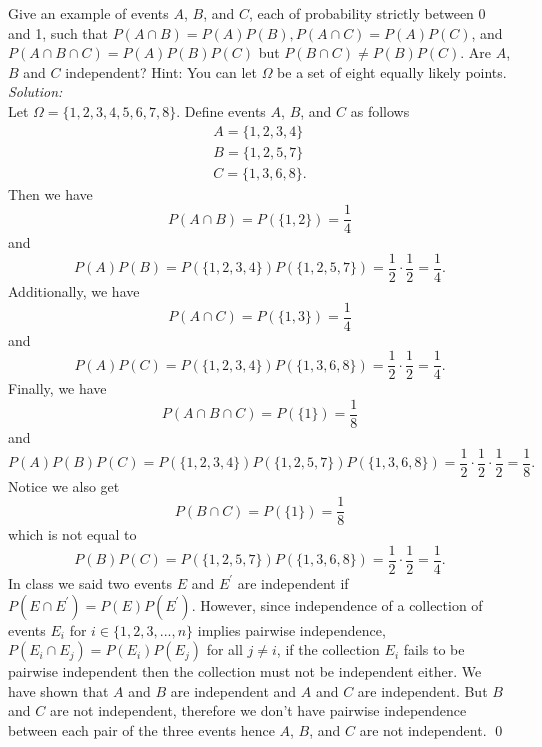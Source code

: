 \documentclass[10pt]{amsart}
\begin{document}
 Give an example of events $A$, $B$, and $C$, each of probability strictly between 0 and 1, such that
$P(A\cap B)=P(A)P(B), P(A\cap C)=P(A)P(C)$, and $P(A\cap B\cap C)=P(A)P(B)P(C)$ but $P(B\cap C)\neq P(B)P(C)$. Are $A$, $B$ and $C$ independent? Hint: You can let $\Omega$ be a set of eight equally likely points. \\
\textit{Solution:} \\
Let $\Omega = \{1, 2, 3, 4, 5, 6, 7, 8\}$.
Define events $A$, $B$, and $C$ as follows
\begin{align*}
A = \{1, 2, 3, 4\} \\
B = \{1, 2, 5, 7\} \\
C = \{1, 3, 6, 8\}.
\end{align*}
Then we have 
$$P(A \cap B) = P(\{ 1, 2 \}) = \frac 1 4$$
and
$$P(A)P(B) = P(\{1, 2, 3, 4\})P(\{1, 2, 5, 7\}) =  \frac 1 2 \cdot \frac 1 2 = \frac 1 4.$$
Additionally, we have 
$$P(A \cap C) = P(\{ 1, 3 \}) = \frac 1 4$$
and
$$P(A)P(C) = P(\{1, 2, 3, 4\})P(\{1, 3, 6, 8\}) =  \frac 1 2 \cdot \frac 1 2 = \frac 1 4.$$
Finally, we have 
$$P(A \cap B \cap C) = P(\{ 1\}) = \frac 1 8$$
and
$$P(A)P(B)P(C) = P(\{1, 2, 3, 4\})P(\{1, 2, 5, 7\})P(\{1, 3, 6, 8\}) =  \frac 1 2 \cdot \frac 1 2 \cdot \frac 1 2 = \frac 1 8.$$
Notice we also get
$$P(B \cap C) = P(\{ 1 \}) = \frac 1 8$$
which is not equal to
$$P(B)P(C) = P(\{1, 2, 5, 7\})P(\{1, 3, 6, 8\}) =  \frac 1 2 \cdot \frac 1 2 = \frac 1 4.$$
In class we said two events $E$ and $E^\prime$ are independent if $P(E\cap E^\prime) = P(E)P(E^\prime)$.
However, since independence of a collection of events $E_i$ for $i \in \{1, 2, 3, ..., n\}$ implies pairwise independence, $P(E_i\cap E_j) = P(E_i)P(E_j)$ for all $j \neq i$, if the collection $E_i$ fails to be pairwise independent then the collection must not be independent either.
We have shown that $A$ and $B$ are independent and $A$ and $C$ are independent.
But $B$ and $C$ are not independent, therefore we don't have pairwise independence between each pair of the three events hence $A$, $B$, and $C$ are not independent.
\qed
\\
\end{document}
